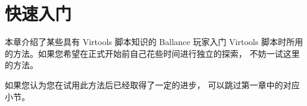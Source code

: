 \chapter{快速入门}
\begin{framed}
本章介绍了某些具有 Virtools 脚本知识的 Ballance 玩家入门 Virtools
脚本时所用的方法。如果您希望在正式开始前自己花些时间进行独立的探索，
不妨一试这里的方法。
\par
如果您认为您在试用此方法后已经取得了一定的进步，
可以跳过第一章中的对应小节。
\end{framed}
